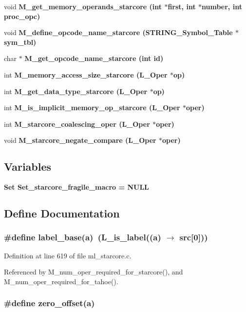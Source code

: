 \begin{CompactItemize}
void \bf{M\_\-get\_\-memory\_\-operands\_\-starcore} (int $\ast$first, int $\ast$number, int proc\_\-opc)
\item 
void \bf{M\_\-define\_\-opcode\_\-name\_\-starcore} (\bf{STRING\_\-Symbol\_\-Table} $\ast$sym\_\-tbl)
\item 
char $\ast$ \bf{M\_\-get\_\-opcode\_\-name\_\-starcore} (int id)
\item 
int \bf{M\_\-memory\_\-access\_\-size\_\-starcore} (L\_\-Oper $\ast$op)
\item 
int \bf{M\_\-get\_\-data\_\-type\_\-starcore} (L\_\-Oper $\ast$op)
\item 
int \bf{M\_\-is\_\-implicit\_\-memory\_\-op\_\-starcore} (L\_\-Oper $\ast$oper)
\item 
int \bf{M\_\-starcore\_\-coalescing\_\-oper} (L\_\-Oper $\ast$oper)
\item 
void \bf{M\_\-starcore\_\-negate\_\-compare} (L\_\-Oper $\ast$oper)
\end{CompactItemize}
\subsection*{Variables}
\begin{CompactItemize}
\item 
\bf{Set} \bf{Set\_\-starcore\_\-fragile\_\-macro} = \bf{NULL}
\end{CompactItemize}


\subsection{Define Documentation}
\subsubsection{\setlength{\rightskip}{0pt plus 5cm}\#define label\_\-base(a)~(L\_\-is\_\-label((a) $\rightarrow$ src[0]))}\label{ml__starcore_8c_6b16c6bbc39332330bf6c262abbf1acb}




Definition at line 619 of file ml\_\-starcore.c.

Referenced by M\_\-num\_\-oper\_\-required\_\-for\_\-starcore(), and M\_\-num\_\-oper\_\-required\_\-for\_\-tahoe().
\subsubsection{\setlength{\rightskip}{0pt plus 5cm}\#define zero\_\-offset(a)}\label{ml__starcore_8c_04722f33d5049c5277f0a9dc628ebf62}


